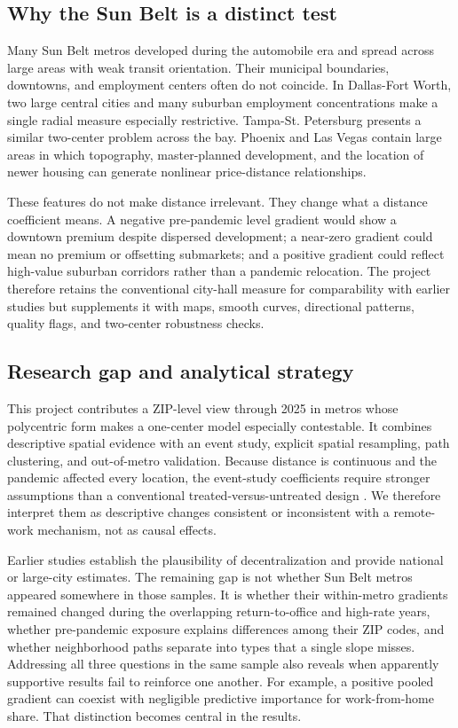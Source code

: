 \documentclass[11pt]{article}
\begin{document}
\subsection{Why the Sun Belt is a distinct test}

Many Sun Belt metros developed during the automobile era and spread across large areas with weak transit orientation. Their
municipal boundaries, downtowns, and employment centers often do not coincide. In Dallas-Fort Worth, two large central cities and
many suburban employment concentrations make a single radial measure especially restrictive. Tampa-St. Petersburg presents a
similar two-center problem across the bay. Phoenix and Las Vegas contain large areas in which topography, master-planned
development, and the location of newer housing can generate nonlinear price-distance relationships.

These features do not make distance irrelevant. They change what a distance coefficient means. A negative pre-pandemic level
gradient would show a downtown premium despite dispersed development; a near-zero gradient could mean no premium or offsetting
submarkets; and a positive gradient could reflect high-value suburban corridors rather than a pandemic relocation. The project
therefore retains the conventional city-hall measure for comparability with earlier studies but supplements it with maps, smooth
curves, directional patterns, quality flags, and two-center robustness checks.

\subsection{Research gap and analytical strategy}

This project contributes a ZIP-level view through 2025 in metros whose polycentric form makes a one-center model especially
contestable. It combines descriptive spatial evidence with an event study, explicit spatial resampling, path clustering, and
out-of-metro validation. Because distance is continuous and the pandemic affected every location, the event-study coefficients
require stronger assumptions than a conventional treated-versus-untreated design \cite{callaway2024did}. We therefore interpret
them as descriptive changes consistent or inconsistent with a remote-work mechanism, not as causal effects.

Earlier studies establish the plausibility of decentralization and provide national or large-city estimates. The remaining gap is
not whether Sun Belt metros appeared somewhere in those samples. It is whether their within-metro gradients remained changed
during the overlapping return-to-office and high-rate years, whether pre-pandemic exposure explains differences among their ZIP
codes, and whether neighborhood paths separate into types that a single slope misses. Addressing all three questions in the same
sample also reveals when apparently supportive results fail to reinforce one another. For example, a positive pooled gradient can
coexist with negligible predictive importance for work-from-home share. That distinction becomes central in the results.
\end{document}
